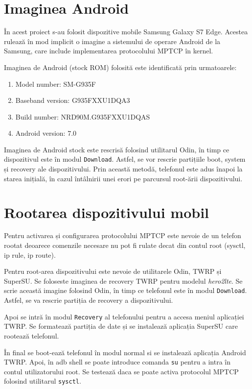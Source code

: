 \section{Imaginea Android}

În acest proiect s-au folosit dispozitive mobile Samsung Galaxy S7 Edge. Acestea rulează în mod implicit o imagine a sistemului de operare Android de la Samsung, care include implementarea protocolului MPTCP în kernel. 

Imaginea de Android (stock ROM) folosită este identificată prin urmatoarele:
\begin{enumerate}
	\item Model number: SM-G935F
	\item Baseband version: G935FXXU1DQA3
	\item Build number: NRD90M.G935FXXU1DQAS
	\item Android version: 7.0
\end{enumerate}

Imaginea de Android stock este rescrisă folosind utilitarul Odin, în timp ce dispozitivul este în modul \texttt{Download}. Astfel, se vor rescrie partițiile boot, system și recovery ale dispozitivului. Prin această metodă, telefonul este adus înapoi la starea inițială, în cazul întâlnirii unei erori pe parcursul root-ării dispozitivului. 

\section{Rootarea dispozitivului mobil}

Pentru activarea și configurarea protocolului MPTCP este nevoie de un telefon rootat deoarece comenzile necesare nu pot fi rulate decat din contul root (sysctl, ip rule, ip route).

Pentru root-area dispozitivului este nevoie de utilitarele Odin, TWRP și SuperSU. Se foloseste imaginea de recovery TWRP pentru modelul \emph{hero2lte}. Se scrie această imagine folosind Odin, în timp ce telefonul este în modul \texttt{Download}. Astfel, se va rescrie partiția de recovery a dispozitivului. 

Apoi se intră în modul \texttt{Recovery} al telefonului pentru a accesa meniul aplicației TWRP. Se formatează partiția de date și se instalează aplicația SuperSU care rootează telefonul. 

În final se boot-ează telefonul în modul normal si se instalează aplicația Android TWRP. Apoi, în adb shell se poate introduce comanda \texttt{su} pentru a intra în contul utilizatorului root. Se testează daca se poate activa protocolul MPTCP folosind utilitarul \texttt{sysctl}.

